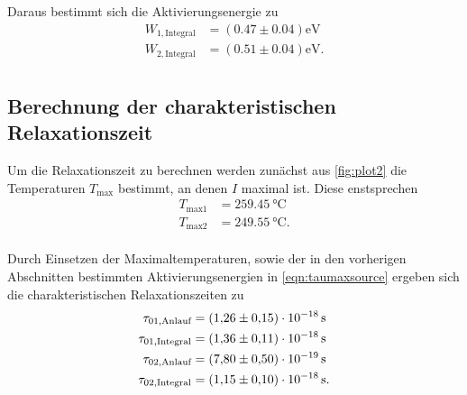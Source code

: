 Daraus bestimmt sich die Aktivierungsenergie zu 
\begin{align*}
  W_{1,\text{Integral}} &= (0.47 \pm 0.04) \unit{\electronvolt}\\
  W_{2,\text{Integral}} &= (0.51 \pm 0.04)\unit{\electronvolt}.\\
\end{align*} 


\subsection{Berechnung der charakteristischen Relaxationszeit}

Um die Relaxationszeit zu berechnen werden zunächst aus \autoref{fig:plot2} die Temperaturen $T_\text{max}$ bestimmt, an denen $I$ maximal ist.
Diese enstsprechen
\begin{align*}
  T_\text{max1} &= \qty{259.45}{\celsius}\\
  T_\text{max2} &= \qty{249.55}{\celsius}.\\
\end{align*}

Durch Einsetzen der Maximaltemperaturen, sowie der in den vorherigen Abschnitten bestimmten Aktivierungsenergien
in \autoref{eqn:taumaxsource} ergeben sich die charakteristischen Relaxationszeiten zu
\begin{align*}
  \tau_{01,\text{Anlauf}} &= \qty{1.26 (15)e-18}{\second}\\ 
  \tau_{01,\text{Integral}} &=\qty{1.36 (11)e-18}{\second}\\
  \tau_{02,\text{Anlauf}} &= \qty{7.80 (50)e-19}{\second}\\
  \tau_{02,\text{Integral}} &=\qty{1.15 (0.10)e-18}{\second}.\\
\end{align*}
